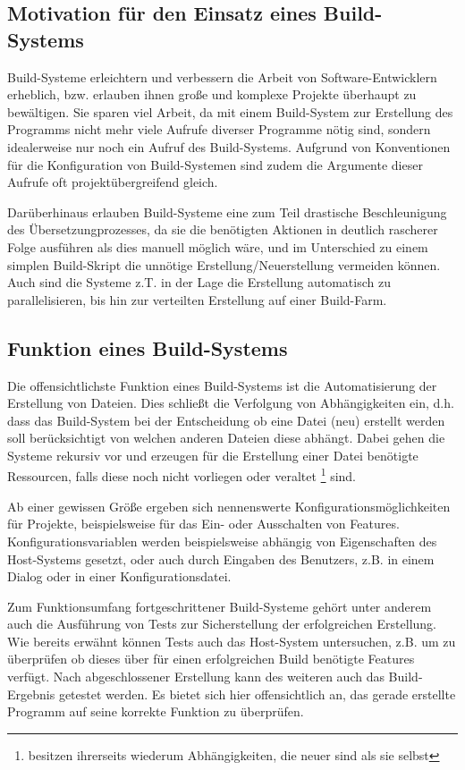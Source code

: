 \subsection{Motivation für den Einsatz eines Build-Systems} 

Build-Systeme erleichtern und verbessern die Arbeit von Software-Entwicklern
erheblich, bzw. erlauben ihnen große und komplexe Projekte überhaupt zu
bewältigen. Sie sparen viel Arbeit, da mit einem Build-System zur Erstellung des
Programms nicht mehr viele Aufrufe diverser Programme nötig sind, sondern
idealerweise nur noch ein Aufruf des Build-Systems.
%
Aufgrund von Konventionen für die Konfiguration von Build-Systemen sind zudem
die Argumente dieser Aufrufe oft projektübergreifend gleich.

Darüberhinaus erlauben Build-Systeme eine zum Teil drastische Beschleunigung des
Übersetzungprozesses, da sie die benötigten Aktionen in deutlich rascherer Folge
ausführen als dies manuell möglich wäre, und im Unterschied zu einem simplen
Build-Skript die unnötige Erstellung/Neuerstellung vermeiden können. Auch sind
die Systeme z.T. in der Lage die Erstellung automatisch zu parallelisieren, bis
hin zur verteilten Erstellung auf einer Build-Farm.

\subsection{Funktion eines Build-Systems}

Die offensichtlichste Funktion eines Build-Systems ist die Automatisierung der
Erstellung von Dateien. Dies schließt die Verfolgung von Abhängigkeiten ein,
d.h. dass das Build-System bei der Entscheidung ob eine Datei (neu) erstellt
werden soll berücksichtigt von welchen anderen Dateien diese abhängt.
%
Dabei gehen die Systeme rekursiv vor und erzeugen für die Erstellung einer Datei
benötigte Ressourcen, falls diese noch nicht vorliegen oder veraltet
\footnote{besitzen ihrerseits wiederum Abhängigkeiten, die neuer sind als sie
selbst} sind.

Ab einer gewissen Größe ergeben sich nennenswerte Konfigurationsmöglichkeiten
für Projekte, beispielsweise für das Ein- oder Ausschalten von Features.
Konfigurationsvariablen werden beispielsweise abhängig von Eigenschaften des
Host-Systems gesetzt, oder auch durch Eingaben des Benutzers, z.B. in einem
Dialog oder in einer Konfigurationsdatei.

%
Zum Funktionsumfang fortgeschrittener Build-Systeme gehört unter anderem auch
die Ausführung von Tests zur Sicherstellung der erfolgreichen Erstellung. Wie
bereits erwähnt können Tests auch das Host-System untersuchen, z.B. um zu
überprüfen ob dieses über für einen erfolgreichen Build benötigte Features
verfügt. Nach abgeschlossener Erstellung kann des weiteren auch das
Build-Ergebnis getestet werden. Es bietet sich hier offensichtlich an, das
gerade erstellte Programm auf seine korrekte Funktion zu überprüfen.

